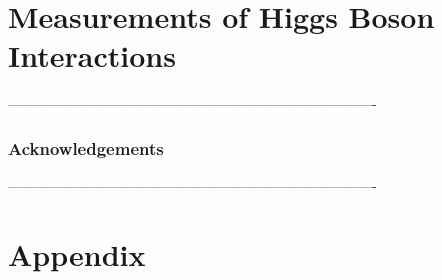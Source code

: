 

\part{Measurements of Higgs Boson Interactions}






-------------------------------------------------------------------------------
\section*{Acknowledgements}
-------------------------------------------------------------------------------


\clearpage
{}
\appendix
\part*{Appendix}




\printbibliography
% 
% 

